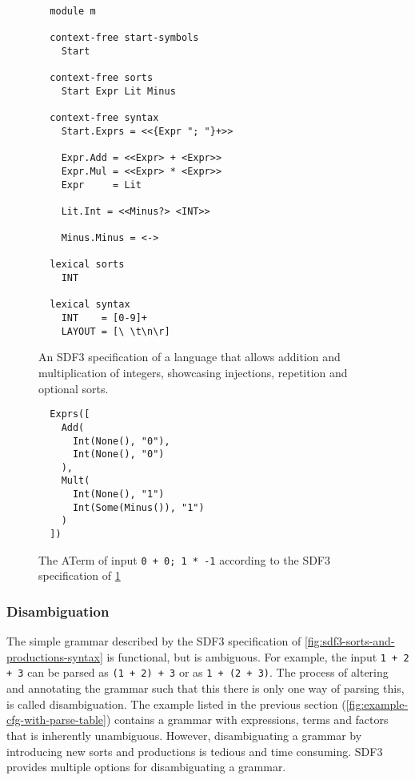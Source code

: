       \begin{figure}
        \begin{verbatim}
  module m

  context-free start-symbols
    Start
  
  context-free sorts
    Start Expr Lit Minus
  
  context-free syntax
    Start.Exprs = <<{Expr "; "}+>>
  
    Expr.Add = <<Expr> + <Expr>>
    Expr.Mul = <<Expr> * <Expr>>
    Expr     = Lit
  
    Lit.Int = <<Minus?> <INT>>
  
    Minus.Minus = <->
  
  lexical sorts
    INT
  
  lexical syntax
    INT    = [0-9]+
    LAYOUT = [\ \t\n\r]
        \end{verbatim}
        \caption{\label{fig:sdf3-syntax-injection-repetition-optional}An SDF3 specification of a language that allows addition and multiplication of integers, showcasing injections, repetition and optional sorts.}
      \end{figure}

      \begin{figure}
        \begin{verbatim}
  Exprs([
    Add(
      Int(None(), "0"),
      Int(None(), "0")
    ),
    Mult(
      Int(None(), "1")
      Int(Some(Minus()), "1")
    )
  ])
        \end{verbatim}
        \caption{\label{fig:example-aterm-injections-etc}The ATerm of input \texttt{0 + 0; 1 * -1} according to the SDF3 specification of \cref{fig:sdf3-syntax-injection-repetition-optional}}
      \end{figure}

      \subsubsection{\label{subsubsec:sdf3-disambiguation}Disambiguation}

        The simple grammar described by the SDF3 specification of \cref{fig:sdf3-sorts-and-productions-syntax} is functional, but is ambiguous. For example, the input \texttt{1 + 2 + 3} can be parsed as \texttt{(1 + 2) + 3} or as \texttt{1 + (2 + 3)}. The process of altering and annotating the grammar such that this there is only one way of parsing this, is called disambiguation. The example listed in the previous section (\cref{fig:example-cfg-with-parse-table}) contains a grammar with expressions, terms and factors that is inherently unambiguous. However, disambiguating a grammar by introducing new sorts and productions is tedious and time consuming. SDF3 provides multiple options for disambiguating a grammar.

